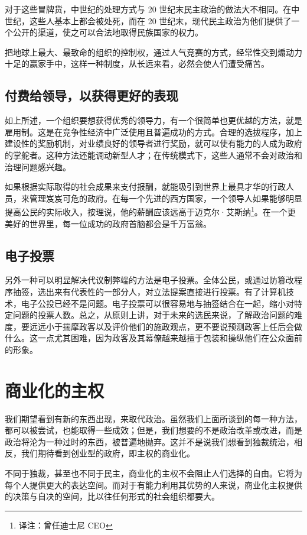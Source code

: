对于这些冒牌货，中世纪的处理方式与 20 世纪末民主政治的做法大不相同。在中世纪，这些人基本上都会被处死，而在 20 世纪末，现代民主政治为他们提供了一个公开的渠道，使之可以合法地取得民族国家的权力。

把地球上最大、最致命的组织的控制权，通过人气竞赛的方式，经常性交到煽动力十足的赢家手中，这样一种制度，从长远来看，必然会使人们遭受痛苦。

\subsection{付费给领导，以获得更好的表现}

如上所述，一个组织要想获得优秀的领导力，有一个很简单也更优越的方法，就是雇用制。这是在竞争性经济中广泛使用且普遍成功的方式。合理的选拔程序，加上建设性的奖励机制，对业绩良好的领导者进行奖励，就可以使有能力的人成为政府的掌舵者。这种方法还能调动新型人才；在传统模式下，这些人通常不会对政治和治理问题感兴趣。

如果根据实际取得的社会成果来支付报酬，就能吸引到世界上最具才华的行政人员，来管理岌岌可危的政府。在每一个先进的西方国家，一个领导人如果能够明显提高公民的实际收入，按理说，他的薪酬应该远高于迈克尔·艾斯纳\footnote{译注：曾任迪士尼 CEO}。在一个更美好的世界里，每一位成功的政府首脑都会是千万富翁。

\subsection{电子投票}
另外一种可以明显解决代议制弊端的方法是电子投票。全体公民，或通过防篡改程序抽签，选出来有代表性的一部分人，对立法提案直接进行投票。有了计算机技术，电子公投已经不是问题。电子投票可以很容易地与抽签结合在一起，缩小对特定问题的投票人数。总之，从原则上讲，对于未来的选民来说，了解政治问题的难度，要远远小于揣摩政客以及评价他们的施政观点，更不要说预测政客上任后会做什么。这一点尤其困难，因为政客及其幕僚越来越擅于包装和操纵他们在公众面前的形象。

\section{商业化的主权}
我们期望看到有新的东西出现，来取代政治。虽然我们上面所谈到的每一种方法，都可以被尝试，也能取得一些成效；但是，我们想要的不是政治改革或改进，而是政治将沦为一种过时的东西，被普遍地抛弃。这并不是说我们想看到独裁统治，相反，我们期待看到创业型的政府，即主权的商业化。

不同于独裁，甚至也不同于民主，商业化的主权不会阻止人们选择的自由。它将为每个人提供更大的表达空间。而对于有能力利用其优势的人来说，商业化主权提供的决策与自决的空间，比以往任何形式的社会组织都要大。

